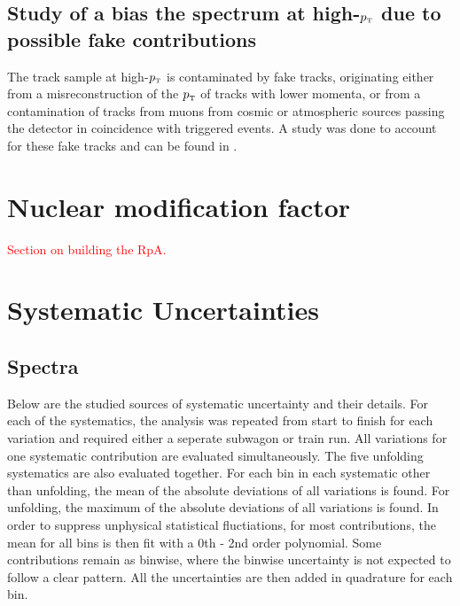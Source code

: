 \documentclass[ALICE]{ALICE_analysis_notes}
\newcommand{\pT}{$p_{\mbox{\tiny T}}$\xspace}
\begin{document}
\subsection{Study of a bias the spectrum at high-\texorpdfstring{\pT}{pT} due to possible fake contributions}
\label{sec:biasStudy}

The track sample at high-\pT is contaminated by fake tracks, originating either from a misreconstruction of the \pT of tracks with lower momenta, or from a contamination of tracks from muons from cosmic or atmospheric sources passing the detector in coincidence with triggered events. A study was done to account for these fake tracks and can be found in \cite{anaNoteMFasel}.\clearpage{}
\clearpage{}\section{Nuclear modification factor}
\label{sec:nuclearModFac}

\textcolor{red}{Section on building the RpA.}\clearpage{}
\clearpage{}\section{Systematic Uncertainties}
\label{chap:Systematics}

\subsection{Spectra}
\label{sec:SystematicsSpectra}

Below are the studied sources of systematic uncertainty and their details. For each of the systematics, the analysis was repeated from start to finish for each variation and required either a seperate subwagon or train run. All variations for one systematic contribution are evaluated simultaneously. The five unfolding systematics are also evaluated together. For each bin in each systematic other than unfolding, the mean of the absolute deviations of all variations is found. For unfolding, the maximum of the absolute deviations of all variations is found. In order to suppress unphysical statistical fluctiations, for most contributions, the mean for all bins is then fit with a 0th - 2nd order polynomial. Some contributions remain as binwise, where the binwise uncertainty is not expected to follow a clear pattern. All the uncertainties are then added in quadrature for each bin.
\end{document}
